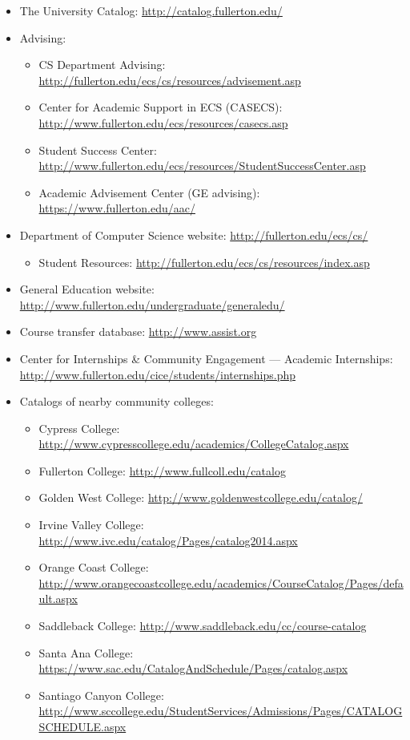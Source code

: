 \documentclass{book}
\begin{document}
\begin{itemize}
\item The University Catalog: \url{http://catalog.fullerton.edu/}
\item Advising:
  \begin{itemize}
    \item CS Department Advising: \url{http://fullerton.edu/ecs/cs/resources/advisement.asp}
  \item Center for Academic Support in ECS (CASECS): \url{http://www.fullerton.edu/ecs/resources/casecs.asp}
  \item Student Success Center: \url{http://www.fullerton.edu/ecs/resources/StudentSuccessCenter.asp}
    \item Academic Advisement Center (GE advising): \url{https://www.fullerton.edu/aac/}
    \end{itemize}
\item Department of Computer Science website: \url{http://fullerton.edu/ecs/cs/}
  \begin{itemize}
  \item Student Resources: \url{http://fullerton.edu/ecs/cs/resources/index.asp}
  \end{itemize}
\item General Education website: \url{http://www.fullerton.edu/undergraduate/generaledu/}
\item Course transfer database: \url{http://www.assist.org}
\item Center for Internships \& Community Engagement --- Academic Internships: \url{http://www.fullerton.edu/cice/students/internships.php}
\item Catalogs of nearby community colleges:
  \begin{itemize}
    \item Cypress College: \url{http://www.cypresscollege.edu/academics/CollegeCatalog.aspx}
    \item Fullerton College: \url{http://www.fullcoll.edu/catalog}
    \item Golden West College: \url{http://www.goldenwestcollege.edu/catalog/}
    \item Irvine Valley College: \url{http://www.ivc.edu/catalog/Pages/catalog2014.aspx}
    \item Orange Coast College: \url{http://www.orangecoastcollege.edu/academics/CourseCatalog/Pages/default.aspx}
    \item Saddleback College: \url{http://www.saddleback.edu/cc/course-catalog}
    \item Santa Ana College: \url{https://www.sac.edu/CatalogAndSchedule/Pages/catalog.aspx}
    \item Santiago Canyon College: \url{http://www.sccollege.edu/StudentServices/Admissions/Pages/CATALOGSCHEDULE.aspx}
  \end{itemize}
\end{itemize}
\end{document}
